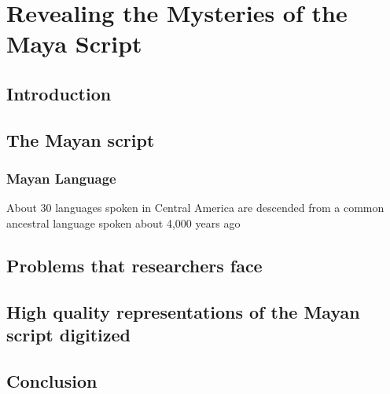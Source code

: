 \documentclass[11pt]{article}
\author{Ryan Sharif}
\date{\today}
\title{}
\begin{document}
\tableofcontents


\section{Revealing the Mysteries of the Maya Script}
\label{sec:orgheadline7}

\subsection{Introduction}
\label{sec:orgheadline1}

\subsection{The Mayan script}
\label{sec:orgheadline3}

\subsubsection{Mayan Language}
\label{sec:orgheadline2}

About 30 languages spoken in Central America are descended from a
common ancestral language spoken about 4,000 years
ago \cite{england_mayan_2003}

\subsection{Problems that researchers face}
\label{sec:orgheadline4}

\subsection{High quality representations of the Mayan script digitized}
\label{sec:orgheadline5}

\subsection{Conclusion}
\label{sec:orgheadline6}
\end{document}
